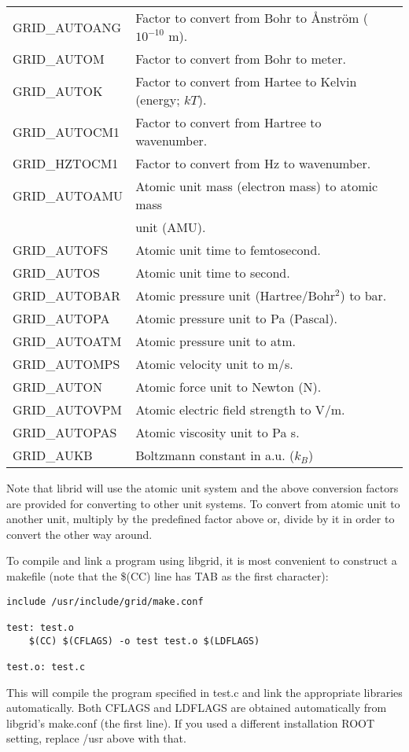 \documentclass[12pt,letterpaper]{report}
\begin{document}
\begin{longtable}{ll}
GRID\_AUTOANG & Factor to convert from Bohr to \AA{}nstr\"om ($10^{-10}$ m).\\
GRID\_AUTOM & Factor to convert from Bohr to meter.\\
GRID\_AUTOK & Factor to convert from Hartee to Kelvin (energy; $kT$).\\
GRID\_AUTOCM1 & Factor to convert from Hartree to wavenumber.\\
GRID\_HZTOCM1 & Factor to convert from Hz to wavenumber.\\
GRID\_AUTOAMU & Atomic unit mass (electron mass) to atomic mass\\
              & unit (AMU).\\
GRID\_AUTOFS & Atomic unit time to femtosecond.\\
GRID\_AUTOS  & Atomic unit time to second.\\
GRID\_AUTOBAR & Atomic pressure unit (Hartree/Bohr$^2$) to bar.\\
GRID\_AUTOPA & Atomic pressure unit to Pa (Pascal).\\
GRID\_AUTOATM & Atomic pressure unit to atm.\\
GRID\_AUTOMPS & Atomic velocity unit to m/s.\\
GRID\_AUTON & Atomic force unit to Newton (N).\\
GRID\_AUTOVPM & Atomic electric field strength to V/m.\\
GRID\_AUTOPAS & Atomic viscosity unit to Pa s.\\
GRID\_AUKB & Boltzmann constant in a.u. ($k_B$)\\ 
\end{longtable}
\noindent
Note that librid will use the atomic unit system and the above conversion factors are provided for converting to other unit systems. To convert from atomic unit to another unit, multiply by the predefined factor above or, divide by it in order to convert the other way around.

To compile and link a program using libgrid, it is most convenient to construct a makefile (note that the \$(CC) line has TAB as the first character):
\begin{verbatim}
include /usr/include/grid/make.conf

test: test.o
    $(CC) $(CFLAGS) -o test test.o $(LDFLAGS)

test.o: test.c
\end{verbatim}
This will compile the program specified in test.c and link the appropriate libraries automatically. Both CFLAGS and LDFLAGS are obtained automatically from libgrid's make.conf (the first line). If you used a different installation ROOT setting, replace /usr above with that.
\end{document}
